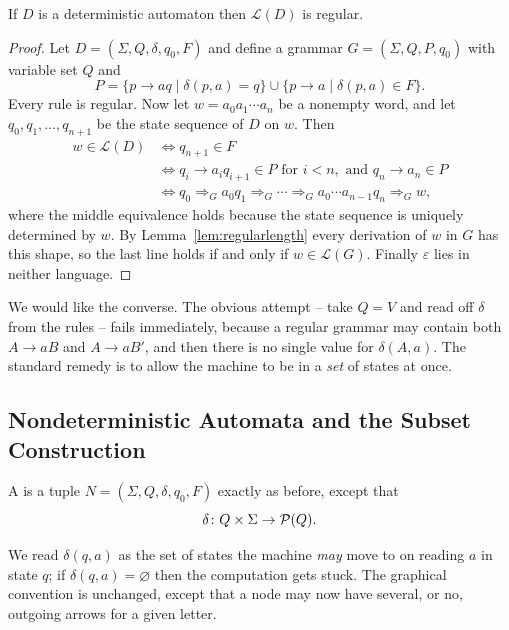 \documentclass[a4paper]{scrartcl}
\newcommand{\lang}{\mathcal{L}}
\newcommand{\eps}{\varepsilon}
\begin{document}
\begin{theorem}\label{thm:dfatogrammar}
	If $D$ is a deterministic automaton then $\lang(D)$ is regular.
\end{theorem}

\begin{proof}
	Let $D = (\Sigma, Q, \delta, q_0, F)$ and define a grammar $G = (\Sigma, Q, P, q_0)$ with variable set $Q$ and
	$$P = \{p \to aq \mid \delta(p,a) = q\} \cup \{p \to a \mid \delta(p,a) \in F\}.$$
	Every rule is regular. Now let $w = a_0a_1\cdots a_n$ be a nonempty word, and let $q_0, q_1, \dots, q_{n+1}$ be the state sequence of $D$ on $w$. Then
	\begin{align*}
		w \in \lang(D) &\iff q_{n+1} \in F \\
		&\iff q_i \to a_iq_{i+1} \in P \text{ for } i < n, \text{ and } q_n \to a_n \in P \\
		&\iff q_0 \Rightarrow_G a_0q_1 \Rightarrow_G \cdots \Rightarrow_G a_0\cdots a_{n-1}q_n \Rightarrow_G w,
	\end{align*}
	where the middle equivalence holds because the state sequence is uniquely determined by $w$. By Lemma~\ref{lem:regularlength} every derivation of $w$ in $G$ has this shape, so the last line holds if and only if $w \in \lang(G)$. Finally $\eps$ lies in neither language.
\end{proof}

We would like the converse. The obvious attempt -- take $Q = V$ and read off $\delta$ from the rules -- fails immediately, because a regular grammar may contain both $A \to aB$ and $A \to aB'$, and then there is no single value for $\delta(A,a)$. The standard remedy is to allow the machine to be in a \emph{set} of states at once.

\subsection{Nondeterministic Automata and the Subset Construction}

\begin{definition}
	A  is a tuple $N = (\Sigma, Q, \delta, q_0, F)$ exactly as before, except that
	$$\delta \colon Q \times \Sigma \to \mathcal{P}(Q).$$
\end{definition}

We read $\delta(q,a)$ as the set of states the machine \emph{may} move to on reading $a$ in state $q$; if $\delta(q,a) = \varnothing$ then the computation gets stuck. The graphical convention is unchanged, except that a node may now have several, or no, outgoing arrows for a given letter.
\end{document}
